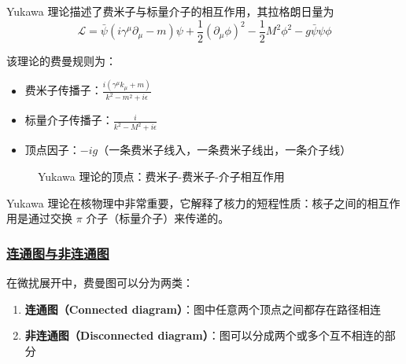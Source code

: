 \begin{example}[Yukawa 理论]
    Yukawa 理论描述了费米子与标量介子的相互作用，其拉格朗日量为
    \begin{equation*}
        \mathcal{L} = \bar{\psi}(i\gamma^\mu\partial_\mu - m)\psi + \frac{1}{2}(\partial_\mu\phi)^2 - \frac{1}{2}M^2\phi^2 - g\bar{\psi}\psi\phi
    \end{equation*}

    该理论的费曼规则为：
    \begin{itemize}
        \item 费米子传播子：$\displaystyle \frac{i(\gamma^\mu k_\mu + m)}{k^2 - m^2 + i\epsilon}$
        \item 标量介子传播子：$\displaystyle \frac{i}{k^2 - M^2 + i\epsilon}$
        \item 顶点因子：$-ig$（一条费米子线入，一条费米子线出，一条介子线）
    \end{itemize}

    \begin{figure}[htbp]
        \centering
        \caption{Yukawa 理论的顶点：费米子-费米子-介子相互作用}
    \end{figure}

    Yukawa 理论在核物理中非常重要，它解释了核力的短程性质：核子之间的相互作用是通过交换 $\pi$ 介子（标量介子）来传递的。
\end{example}

\subsubsection{\protect\hyperlink{:}{连通图与非连通图}}

在微扰展开中，费曼图可以分为两类：
\begin{enumerate}
    \item \textbf{连通图（Connected diagram）}：图中任意两个顶点之间都存在路径相连
    \item \textbf{非连通图（Disconnected diagram）}：图可以分成两个或多个互不相连的部分
\end{enumerate}

